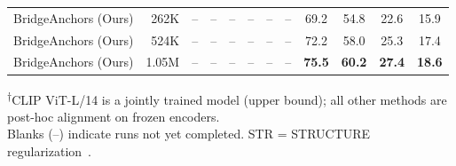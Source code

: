 \begin{table}[t]
{\begin{tabular}{l r *{6}{c} *{4}{c}}
\midrule
BridgeAnchors (Ours)
& 262K
& -- & -- & -- & -- & -- & --
& 69.2 & 54.8
& 22.6 & 15.9 \\
BridgeAnchors (Ours)
& 524K
& -- & -- & -- & -- & -- & --
& 72.2 & 58.0
& 25.3 & 17.4 \\
BridgeAnchors (Ours)
& 1.05M
& -- & -- & -- & -- & -- & --
& \textbf{75.5} & \textbf{60.2}
& \textbf{27.4} & \textbf{18.6} \\
\bottomrule
\end{tabular}
}
\vspace{-4pt}
\begin{flushleft}
\footnotesize
\textsuperscript{$\dagger$}CLIP ViT-L/14 is a jointly trained model (upper bound); all other methods are post-hoc alignment on frozen encoders. \\
Blanks (--) indicate runs not yet completed. STR = STRUCTURE regularization~\citep{xxx}.
\end{flushleft}
\end{table}
